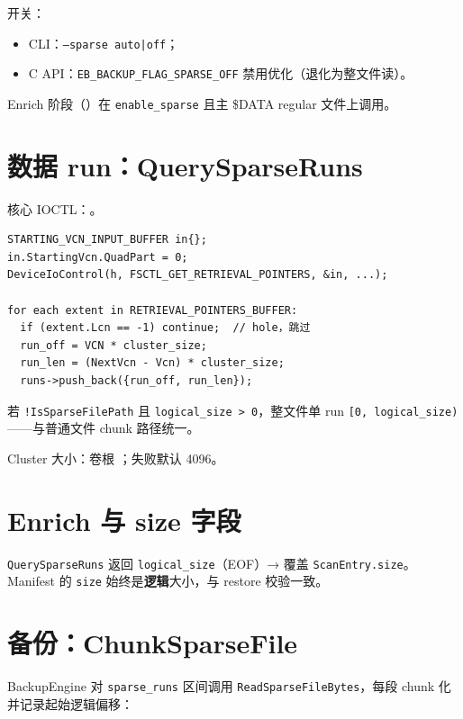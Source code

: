开关：
\begin{itemize}[nosep]
  \item CLI：\texttt{--sparse auto|off}；
  \item C API：\texttt{EB\_BACKUP\_FLAG\_SPARSE\_OFF} 禁用优化（退化为整文件读）。
\end{itemize}

Enrich 阶段（）在 \texttt{enable\_sparse} 且主 \$DATA regular 文件上调用。

\section{数据 run：QuerySparseRuns}

核心 IOCTL：。

\begin{lstlisting}[caption={QuerySparseRuns 核心循环 (sparse\_file.cc)}]
STARTING_VCN_INPUT_BUFFER in{};
in.StartingVcn.QuadPart = 0;
DeviceIoControl(h, FSCTL_GET_RETRIEVAL_POINTERS, &in, ...);

for each extent in RETRIEVAL_POINTERS_BUFFER:
  if (extent.Lcn == -1) continue;  // hole，跳过
  run_off = VCN * cluster_size;
  run_len = (NextVcn - Vcn) * cluster_size;
  runs->push_back({run_off, run_len});
\end{lstlisting}

\begin{designbox}
若 \texttt{!IsSparseFilePath} 且 \texttt{logical\_size > 0}，整文件单 run \texttt{[0, logical\_size)}——与普通文件 chunk 路径统一。
\end{designbox}

Cluster 大小：卷根 ；失败默认 4096。

\section{Enrich 与 size 字段}

\texttt{QuerySparseRuns} 返回 \texttt{logical\_size}（EOF）→ 覆盖 \texttt{ScanEntry.size}。
Manifest 的 \texttt{size} 始终是\textbf{逻辑}大小，与 restore 校验一致。

\section{备份：ChunkSparseFile}

BackupEngine 对 \texttt{sparse\_runs} 区间调用 \texttt{ReadSparseFileBytes}，每段 chunk 化并记录起始逻辑偏移：

